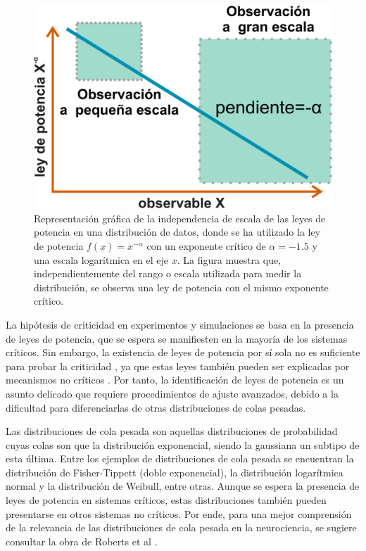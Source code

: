 \begin{figure}[h!]
	\centering\includegraphics[width=\imsize]{ley_potencia}
	\caption[Representación gráfica de la independencia de escala de las leyes de potencia en una distribución de datos.]{Representación gráfica de la independencia de escala de las leyes de potencia en una distribución de datos, donde se ha utilizado la ley de potencia $f(x) = x^{-\alpha}$  con un exponente crítico de $\alpha=-1.5$ y una escala logarítmica en el eje $x$. La figura muestra que, independientemente del rango o escala utilizada para medir la distribución, se observa una ley de potencia con el mismo exponente crítico.} 	\label{fig:leypotencia}
\end{figure}


La hipótesis de criticidad en experimentos y simulaciones se basa en la presencia de leyes de potencia, que se espera se manifiesten en la mayoría de los sistemas críticos. Sin embargo, la existencia de leyes de potencia por sí sola no es suficiente para probar la criticidad \cite{goldstein_problems_2004,priesemann_can_2018}, ya que estas leyes también pueden ser explicadas por mecanismos no críticos \cite{touboul_can_2010,markovic_power_2014,noauthor_critical_2006,beggs_being_2012}. Por tanto, la identificación de leyes de potencia es un asunto delicado que requiere procedimientos de ajuste avanzados, debido a la dificultad para diferenciarlas de otras distribuciones de colas pesadas.

Las distribuciones de cola pesada son aquellas distribuciones de probabilidad cuyas colas son  que la distribución exponencial, siendo la gaussiana un subtipo de esta última. Entre los ejemplos de distribuciones de cola pesada se encuentran la distribución de Fisher-Tippett (doble exponencial), la distribución logarítmica normal y la distribución de Weibull, entre otras. Aunque se espera la presencia de leyes de potencia en sistemas críticos, estas distribuciones también pueden presentarse en otros sistemas no críticos. Por ende, para una mejor comprensión de la relevancia de las distribuciones de cola pesada en la neurociencia, se sugiere consultar la obra de Roberts et al  \cite{roberts_heavy_2015}.

